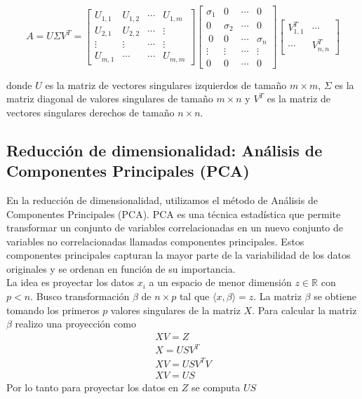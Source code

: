 \documentclass[12pt,a4]{article} %
\begin{document}
\begin{equation}
    A = U \Sigma V^T= \begin{bmatrix}
    U_{1,1} & U_{1,2} & \cdots & U_{1,m} \\
    U_{2,1} & U_{2,2} & \cdots & \vdots \\
    \vdots & \vdots & \cdots & \vdots \\
    U_{m,1} & \cdots & \cdots & U_{m,m}
    \end{bmatrix}\begin{bmatrix}
    \sigma_1 & 0  &\cdots &0\\
    0 & \sigma_2  &\cdots &0\\\
    0 & 0 &\cdots &\sigma_ n\\
    \vdots & \vdots &\cdots &\vdots\\
    0&0&\cdots &0
    \end{bmatrix}\begin{bmatrix}
    V^{T}_{1,1} & \cdots \\
    \cdots & V^{T}_{n,n}
    \end{bmatrix}
    \label{svd}
\end{equation}




donde \(U\) es la matriz de vectores singulares izquierdos de tamaño \(m \times m\), \(\Sigma\) es la matriz diagonal de valores singulares de tamaño \(m \times n\) y \(V^T\) es la matriz de vectores singulares derechos de tamaño \(n \times n\).

\subsection{Reducción de dimensionalidad: Análisis de Componentes Principales (PCA)}
\label{PCA}
En la reducción de dimensionalidad, utilizamos el método de Análisis de Componentes Principales (PCA). PCA es una técnica estadística que permite transformar un conjunto de variables correlacionadas en un nuevo conjunto de variables no correlacionadas llamadas componentes principales. Estos componentes principales capturan la mayor parte de la variabilidad de los datos originales y se ordenan en función de su importancia.
\\
La idea es proyectar los datos $x_i$ a un espacio de menor dimensión $z\in\mathbb{R}$ con $p<n$. Busco transformación $\beta$ de $n\times p$ tal que $\langle x,\beta \rangle = z$.
La matriz $\beta$ se obtiene tomando los primeros $p$ valores singulares de la matriz $X$. 
Para calcular la matriz $\beta$ realizo una proyección como 
\begin{align}
    XV = Z\\
    X = USV^T\\
    XV=USV^{T}V\\
    XV=US
\end{align}
Por lo tanto para proyectar los datos en $Z$ se computa $US$
\end{document}

